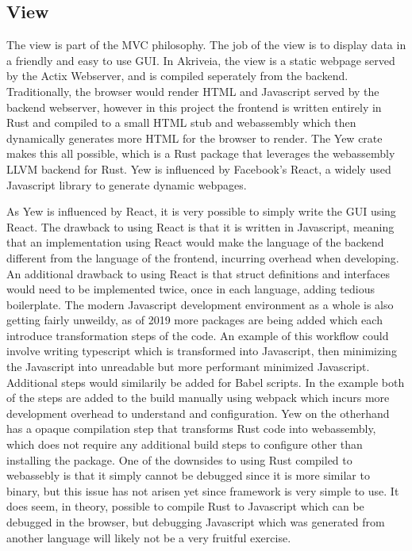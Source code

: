 \subsection{View}
\label{view_section}
The view is part of the MVC philosophy.
The job of the view is to display data in a friendly and easy to use GUI.
In Akriveia, the view is a static webpage served by the Actix Webserver, and is compiled seperately from the backend.
Traditionally, the browser would render HTML and Javascript served by the backend webserver, however in this project the frontend is written entirely in Rust and compiled to a small HTML stub and webassembly which then dynamically generates more HTML for the browser to render.
The Yew crate makes this all possible, which is a Rust package that leverages the webassembly LLVM backend for Rust.
Yew is influenced by Facebook's \Gls{React}, a widely used Javascript library to generate dynamic webpages.

\bigskip
As Yew is influenced by React, it is very possible to simply write the GUI using React.
The drawback to using React is that it is written in Javascript, meaning that an implementation using React would make the language of the backend different from the language of the frontend, incurring overhead when developing.
An additional drawback to using React is that struct definitions and interfaces would need to be implemented twice, once in each language, adding tedious boilerplate.
The modern Javascript development environment as a whole is also getting fairly unweildy, as of 2019 more packages are being added which each introduce transformation steps of the code.
An example of this workflow could involve writing typescript which is transformed into Javascript, then minimizing the Javascript into unreadable but more performant minimized Javascript.
Additional steps would similarily be added for \Gls{Babel} scripts.
In the example both of the steps are added to the build manually using webpack which incurs more development overhead to understand and configuration.
Yew on the otherhand has a opaque compilation step that transforms Rust code into webassembly, which does not require any additional build steps to configure other than installing the package.
One of the downsides to using Rust compiled to webassebly is that it simply cannot be debugged since it is more similar to binary, but this issue has not arisen yet since framework is very simple to use.
It does seem, in theory, possible to compile Rust to Javascript which can be debugged in the browser, but debugging Javascript which was generated from another language will likely not be a very fruitful exercise.

